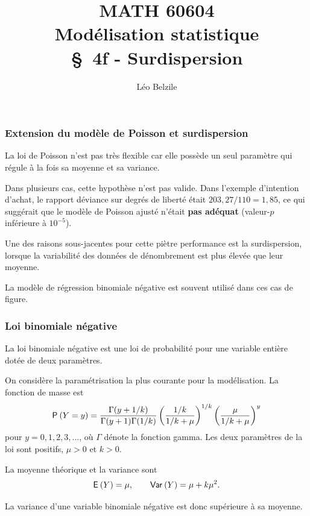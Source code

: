 \documentclass{beamer}
\title[\color{white}{MATH 60604 \S~4f - Surdispersion}]{\texorpdfstring{MATH 60604 \\Modélisation statistique \\ \S~4f - Surdispersion}{MATH 60604 \\Modélisation statistique \\ \S~4f - Surdispersion}}
\author{Léo Belzile}
\institute{HEC Montréal\\
Département de sciences de la décision}
\date{}
\begin{document}
\frame{\titlepage}

\begin{frame}[fragile]
\frametitle{Extension du modèle de Poisson et surdispersion}
\bi
\item La loi de Poisson n'est pas très flexible car elle possède un seul paramètre qui régule à la fois sa moyenne et sa variance.
\item Dans plusieurs cas, cette hypothèse n'est pas valide. Dans l'exemple d'intention d'achat, le rapport déviance sur degrés de liberté était  $203,27/110 = 1,85$, ce qui suggérait que le modèle de Poisson ajusté n'était \textbf{pas adéquat} (valeur-$p$ inférieure à $10^{-5}$).
\item Une des raisons sous-jacentes pour cette piètre performance est la surdispersion, lorsque la variabilité des données de dénombrement est plus élevée que leur moyenne.
\item La modèle de régression \alert{binomiale négative} est souvent utilisé dans ces cas de figure.
\ei
\end{frame}


\begin{frame}[fragile]
\frametitle{Loi binomiale négative}
\bi
\item La loi  binomiale négative est une loi de probabilité pour une variable  \alert{entière} dotée de deux paramètres.
\item On considère la paramétrisation la plus courante pour la modélisation. La fonction de masse est
\begin{align*}
\P{Y=y}=\frac{\Gamma(y+1/k)}{\Gamma(y+1)\Gamma(1/k)} \left(\frac{1/k}{1/k + \mu} \right)^{1/k} \left(\frac{\mu}{1/k+\mu}\right)^y
\end{align*}
pour $y=0, 1, 2, 3, \ldots$, où $\Gamma$ dénote la fonction gamma. Les deux paramètres de la loi sont positifs, $\mu>0$ et $k>0$.

\item La moyenne théorique et la variance sont \begin{align*}
\E{Y}=\mu, \qquad \Va{Y}=\mu+k\mu^2.                                 \end{align*}
\item La variance d'une variable binomiale négative est donc \alert{supérieure} à sa moyenne. 
\ei
\end{frame}
\end{document}
